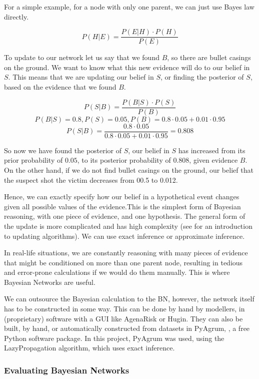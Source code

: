 \documentclass[12pt]{article}
\begin{document}
For a simple example, for a node with only one parent, we can just use Bayes law directly.


\[ P(H | E) =  \frac{P(E | H) \cdot P(H)}{P(E)}\]




To update to our network let us say that we found $B$, so there are bullet casings on the ground. We want to know what this new evidence will do to our belief in $S$. This means that we are updating our belief in $S$, or finding the posterior of $S$, based on the evidence that we found $B$.

\[ P(S | B) =  \frac{P(B | S) \cdot P(S)}{P(B)}\]
\[ P(B | S) = 0.8, P(S) = 0.05, P(B) = 0.8 \cdot 0.05 + 0.01 \cdot 0.95\]
\[ P(S | B) =  \frac{0.8 \cdot 0.05}{0.8 \cdot 0.05 + 0.01 \cdot 0.95} = 0.808\]

So now we have found the posterior of $S$, our belief in $S$ has increased from its prior probability of $0.05$, to its posterior probability of $0.808$, given evidence $B$. On the other hand, if we do not find bullet casings on the ground, our belief that the suspect shot the victim decreases from 00.5 to 0.012. 


Hence, we can exactly specify how our belief in a hypothetical event changes given all possible values of the evidence.This is the simplest form of Bayesian reasoning, with one piece of evidence, and one hypothesis. The general form of the update is more complicated and has high complexity (see \citep{russellNorvig2010} for an introduction to updating algorithms). We can use exact inference or approximate inference.


In real-life situations, we are constantly reasoning with many pieces of evidence that might be conditioned on more than one parent node, resulting in tedious and error-prone calculations if we would do them manually. This is where Bayesian Networks are useful. 



We can outsource the Bayesian calculation to the BN, however, the network itself has to be constructed in some way. This can be done by hand by modellers, in (proprietary) software with a GUI like AgenaRisk or Hugin. They can also be built, by hand, or automatically constructed from datasets in PyAgrum, \citep{pyagrum2020}, a free Python software package. In this project, PyAgrum was used, using the LazyPropagation algorithm, which uses exact inference.



\subsubsection{Evaluating Bayesian Networks}
\end{document}
